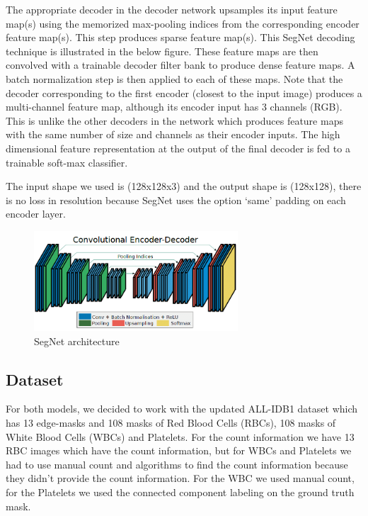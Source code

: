 \documentclass[conference]{IEEEtran}
\begin{document}
The appropriate decoder in the decoder network upsamples its input feature map(s) using the memorized max-pooling indices from the corresponding encoder feature map(s). This step produces sparse feature map(s). This SegNet decoding technique is illustrated in the below figure.
These feature maps are then convolved with a trainable decoder filter bank to produce dense feature maps. A batch normalization step is then applied to each of these maps. Note that the decoder corresponding to the first encoder (closest to the input image) produces a multi-channel feature map, although its encoder input has 3 channels (RGB).
This is unlike the other decoders in the network which produces feature maps with the same number of size and channels as their encoder inputs. The high dimensional feature representation at the output of the final decoder is fed to a trainable soft-max classifier. \cite{badrinarayanan2017segnet}

The input shape we used is (128x128x3) and the output shape is (128x128), there is no loss in resolution because SegNet uses the option `same' padding on each encoder layer.

\vspace{0.1in}

\begin{figure}
\centering
  \vspace{-0.1in}
    \centerline{\includegraphics[width = 3in]{images/segnet.png}}
    \caption{SegNet architecture}
\end{figure}

\subsection{Dataset}
\hspace{\parindent}
For both models, we decided to work with the updated ALL-IDB1 dataset which has 13 edge-masks and 108 masks of Red Blood Cells (RBCs), 108 masks of White Blood Cells (WBCs) and Platelets. For the count information we have 13 RBC images which have the count information, but for WBCs and Platelets we had to use manual count and algorithms to find the count information because they didn't provide the count information. For the WBC we used manual count, for the Platelets we used the connected component labeling on the ground truth mask.\
\end{document}
